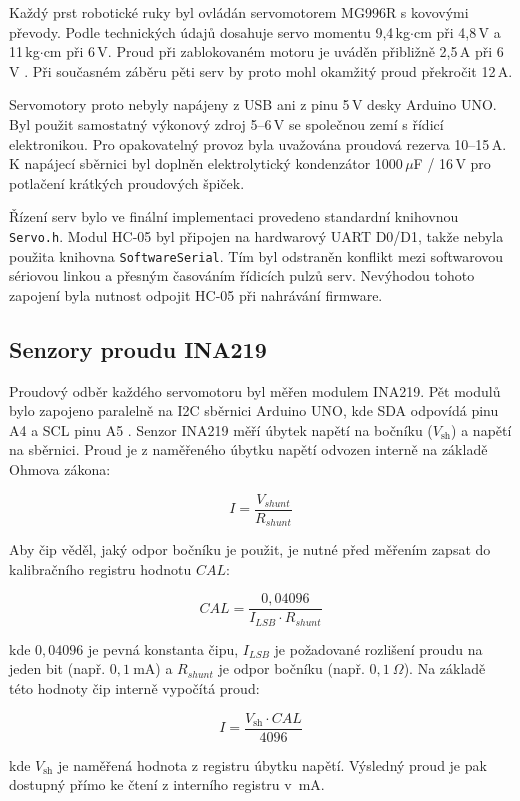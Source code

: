 Každý prst robotické ruky byl ovládán servomotorem MG996R s kovovými převody. Podle technických údajů dosahuje servo momentu 9,4\,kg$\cdot$cm při 4,8\,V a 11\,kg$\cdot$cm při 6\,V. Proud při zablokovaném motoru je uváděn přibližně 2,5\,A při 6\,V \cite{mg996r_towerpro}. Při současném záběru pěti serv by proto mohl okamžitý proud překročit 12\,A.

Servomotory proto nebyly napájeny z USB ani z pinu 5\,V desky Arduino UNO\@. Byl použit samostatný výkonový zdroj 5--6\,V se společnou zemí s řídicí elektronikou. Pro opakovatelný provoz byla uvažována proudová rezerva 10--15\,A. K napájecí sběrnici byl doplněn elektrolytický kondenzátor 1000\,$\mu$F / 16\,V pro potlačení krátkých proudových špiček.

Řízení serv bylo ve finální implementaci provedeno standardní knihovnou \texttt{Servo.h}. Modul HC-05 byl připojen na hardwarový UART D0/D1, takže nebyla použita knihovna \texttt{SoftwareSerial}. Tím byl odstraněn konflikt mezi softwarovou sériovou linkou a přesným časováním řídicích pulzů serv. Nevýhodou tohoto zapojení byla nutnost odpojit HC-05 při nahrávání firmware.

\subsection{Senzory proudu INA219}
\label{subsec:ina219}

Proudový odběr každého servomotoru byl měřen modulem INA219. Pět modulů bylo zapojeno paralelně na I2C sběrnici Arduino UNO, kde SDA odpovídá pinu A4 a SCL pinu A5 \cite{Lebosse2011,ti_ina219}. Senzor INA219 měří úbytek napětí na bočníku ($V_{\mathrm{sh}}$) a napětí
na sběrnici. Proud je z naměřeného úbytku napětí odvozen interně na základě
Ohmova zákona:

$$I = \frac{V_{shunt}}{R_{shunt}}$$

Aby čip věděl, jaký odpor bočníku je použit, je nutné před měřením zapsat
do kalibračního registru hodnotu $CAL$:

$$CAL = \frac{0{,}04096}{I_{LSB} \cdot R_{shunt}}$$

kde $0{,}04096$ je pevná konstanta čipu, $I_{LSB}$ je požadované rozlišení
proudu na jeden bit (např. $0{,}1\ \mathrm{mA}$) a $R_{shunt}$ je odpor
bočníku (např. $0{,}1\ \Omega$). Na základě této hodnoty čip interně
vypočítá proud:

$$I = \frac{V_{\mathrm{sh}} \cdot CAL}{4096}$$

kde $V_{\mathrm{sh}}$ je naměřená hodnota z registru úbytku napětí.
Výsledný proud je pak dostupný přímo ke čtení z interního registru v~mA.

